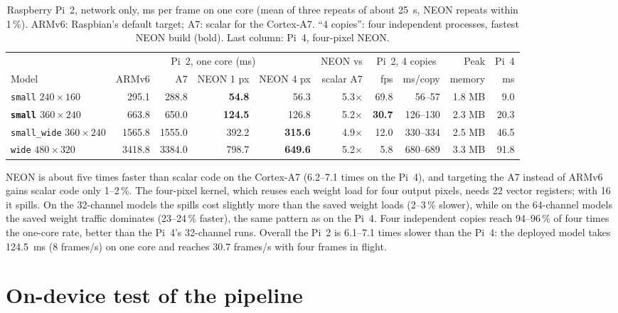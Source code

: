 \documentclass[11pt,a4paper]{article}
\newcommand{\cfg}[1]{\texttt{#1}}
\begin{document}
\begin{table}[H]
\centering
\caption{Raspberry Pi~2, network only, ms per frame on one core (mean of
three repeats of about 25~s, NEON repeats within 1\,\%). ARMv6:
Raspbian's default target; A7: scalar for the Cortex-A7. ``4 copies'':
four independent processes, fastest NEON build (bold). Last column: Pi~4,
four-pixel NEON.}
\label{tab:pi2}
\footnotesize
\setlength{\tabcolsep}{3.5pt}
\begin{tabular}{lrrrrrrrrr}
\toprule
 & \multicolumn{4}{c}{Pi~2, one core (ms)} & NEON vs & \multicolumn{2}{c}{Pi~2, 4 copies} & Peak & Pi~4 \\
\cmidrule(lr){2-5}\cmidrule(lr){7-8}
Model & ARMv6 & A7 & NEON 1 px & NEON 4 px & scalar A7 & fps & ms/copy & memory & ms \\
\midrule
\cfg{small} $240{\times}160$ & 295.1 & 288.8 & \textbf{54.8} & 56.3 & 5.3$\times$ & 69.8 & 56--57 & 1.8 MB & 9.0 \\
\textbf{\cfg{small} $360{\times}240$} & 663.8 & 650.0 & \textbf{124.5} & 126.8 & 5.2$\times$ & \textbf{30.7} & 126--130 & 2.3 MB & 20.3 \\
\cfg{small\_wide} $360{\times}240$ & 1565.8 & 1555.0 & 392.2 & \textbf{315.6} & 4.9$\times$ & 12.0 & 330--334 & 2.5 MB & 46.5 \\
\cfg{wide} $480{\times}320$ & 3418.8 & 3384.0 & 798.7 & \textbf{649.6} & 5.2$\times$ & 5.8 & 680--689 & 3.3 MB & 91.8 \\
\bottomrule
\end{tabular}
\end{table}

NEON is about five times faster than scalar code on the Cortex-A7
(6.2--7.1 times on the Pi~4), and targeting the A7 instead of ARMv6 gains
scalar code only 1--2\,\%. The four-pixel kernel, which reuses each
weight load for four output pixels, needs 22 vector registers; with 16 it
spills. On the 32-channel models the spills cost slightly more than the
saved weight loads (2--3\,\% slower), while on the 64-channel models the
saved weight traffic dominates (23--24\,\% faster), the same pattern as
on the Pi~4. Four independent copies reach 94--96\,\% of four times the
one-core rate, better than the Pi~4's 32-channel runs. Overall the Pi~2 is
6.1--7.1 times slower than the Pi~4: the deployed model takes 124.5~ms
(8 frames/s) on one core and reaches 30.7 frames/s with four frames in
flight.

\section{On-device test of the pipeline}
\label{sec:method}
\end{document}
